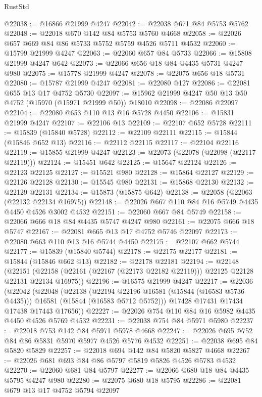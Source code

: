 \begin{lexlean}{RustStd}
\begin{coremodule}
@22038 := @16866 @21999 @4247
@22042 := @22038 @671 @84 @5753 @5762
@22048 := @22018 @670 @142 @84 @5753 @5760 @4668
@22058 := @22026 @657 @669 @84 @86 @5733 @5752 @5759 @4526 @5711 @4532
@22060 := @15799 @21999 @4247
@22063 := @22060 @657 @84 @5733
@22066 := @15808 @21999 @4247 @642
@22073 := @22066 @656 @18 @84 @4435 @5731 @4247 @980
@22075 := @15778 @21999 @4247
@22078 := @22075 @656 @18 @5731
@22080 := @15787 @21999 @4247
@22081 := @22080 @127
@22086 := @22081 @655 @13 @17 @4752 @5730
@22097 := @15962 @21999 @4247 @50 @13 @50 @4752 (@15970 (@15971 @21999 @50)) @18010
@22098 := @22086 @22097
@22104 := @22080 @653 @110 @13 @16 @5728 @4450
@22106 := @15831 @21999 @4247
@22107 := @22106 @13
@22109 := @22107 @652 @5728
@22111 := @15839 (@15840 @5728)
@22112 := @22109 @22111
@22115 := @15844 (@15846 @652 @13)
@22116 := @22112 @22115
@22117 := @22104 @22116
@22119 := @15855 @21999 @4247
@22123 := @22073 (@22078 (@22098 (@22117 @22119)))
@22124 := @15451 @642
@22125 := @15647 @22124
@22126 := @22123 @22125
@22127 := @15521 @980
@22128 := @15864 @22127
@22129 := @22126 @22128
@22130 := @15545 @980
@22131 := @15868 @22130
@22132 := @22129 @22131
@22134 := @15873 (@15875 @642)
@22138 := @22058 (@22063 (@22132 @22134 @16975))
@22148 := @22026 @667 @110 @84 @16 @5749 @4435 @4450 @4526 @3002 @4532
@22151 := @22060 @667 @84 @5749
@22158 := @22066 @666 @18 @84 @4435 @5747 @4247 @980
@22161 := @22075 @666 @18 @5747
@22167 := @22081 @665 @13 @17 @4752 @5746 @22097
@22173 := @22080 @663 @110 @13 @16 @5744 @4450
@22175 := @22107 @662 @5744
@22177 := @15839 (@15840 @5744)
@22178 := @22175 @22177
@22181 := @15844 (@15846 @662 @13)
@22182 := @22178 @22181
@22194 := @22148
    (@22151 (@22158 (@22161 (@22167 (@22173 @22182 @22119))) @22125 @22128 @22131 @22134 @16975))
@22196 := @16575 @21999 @4247
@22217 := @22036
    (@22042
      (@22048
        (@22138
          (@22194 @22196 @16581 (@15844 (@16583 @5736 @4435)))
          @16581
          (@15844 (@16583 @5712 @5752)))
        @17428
        @17431
        @17434
        @17438
        @17443
        @17656))
@22227 := @22026 @754 @110 @84 @16 @5982 @4435 @4450 @4526 @5769 @4532
@22231 := @22038 @754 @84 @5971 @5980
@22237 := @22018 @753 @142 @84 @5971 @5978 @4668
@22247 := @22026 @695 @752 @84 @86 @5831 @5970 @5977 @4526 @5776 @4532
@22251 := @22038 @695 @84 @5820 @5829
@22257 := @22018 @694 @142 @84 @5820 @5827 @4668
@22267 := @22026 @681 @693 @84 @86 @5797 @5819 @5826 @4526 @5783 @4532
@22270 := @22060 @681 @84 @5797
@22277 := @22066 @680 @18 @84 @4435 @5795 @4247 @980
@22280 := @22075 @680 @18 @5795
@22286 := @22081 @679 @13 @17 @4752 @5794 @22097

\end{coremodule}
\end{lexlean}
